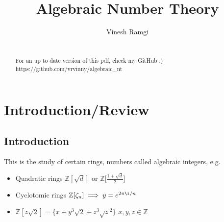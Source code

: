 \documentclass[11pt]{article}
\begin{document}
\newtheorem{theorem}{Theorem}[section]
\newtheorem{defn}[theorem]{Definition}
\newtheorem{prop}[theorem]{Proposition}
\newtheorem{cor}[theorem]{Corollary}
\newtheorem{lemma}[theorem]{Lemma}
\newcommand{\R}{\mathbb{R}}
\newcommand{\Z}{\mathbb{Z}}
\newcommand{\C}{\mathbb{C}}
\newcommand{\Q}{\mathbb{Q}}
\newcommand{\A}{\alpha}
\newcommand{\aaa}{\alpha}
\newcommand{\z}{\zeta}
\newcommand{\ring}{\mathcal{O}}
\newcommand{\spa}{$ $\\[-0.5em]}
\newcommand{\spac}{$ $\\[1em]}
\newcommand{\B}{\beta}
\newcommand{\G}{\gamma}
\newcommand{\bba}{\mathcal{B}}
\newcommand{\dd}{\Delta}
\newcommand{\ttt}{\theta}
\newcommand{\phh}{\varphi}
\newcommand{\ff}{\mathbb{F}}
\newcommand{\ii}{\mathcal{I}}
\newcommand{\pp}{\mathcal{P}}






\title{Algebraic Number Theory}
\author{Vinesh Ramgi}
	\maketitle


\newpage
	\begin{abstract}

		 \\[2em]

		For an up to date version of this pdf, check my GitHub :)\\[0.5em]
https://github.com/vrvinny/algebraic\_nt

	\end{abstract}
\newpage
\tableofcontents{}
\newpage
	\section{Introduction/Review}
	\subsection{Introduction}
		This is the study of certain rings, numbers called algebraic integers, e.g. 
	
	\begin{itemize}
		\item{Quadratic rings $\Z[\sqrt{d}]$ or $\Z [\frac{1+\sqrt{d}}{2}$]}
		\item{Cyclotomic rings $\Z[\zeta_n] \implies y = e^{2\pi \i /n }$}
		\item{$\Z[z\sqrt{2}] = \{ x+y^3\sqrt{2} + z^3 \sqrt{z}^2 \}$ $x,y,z \in \Z$}
	\end{itemize}
\end{document}
